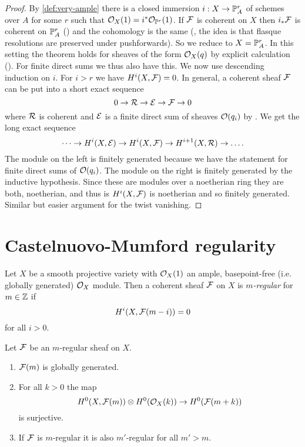 \begin{proof}
	By \cref{def:very-ample} there is a closed immersion $i: X \to \mathbb{P}^r_A$ of schemes over $A$ for some $r$ such that $\mathcal{O}_X(1) = i^*\mathcal{O}_{\mathbb{P}^r}(1)$. If $\mathcal{F}$ is coherent on $X$ then $i_*\mathcal{F}$ is coherent on $\mathbb{P}^r_A$ (\cite[Exercise II.5.5]{hartshorne2013algebraic}) and the cohomology is the same (\cite[Lemma~III.2.10]{hartshorne2013algebraic}, the idea is that flasque resolutions are preserved under pushforwards). So we reduce to $X = \mathbb{P}^r_A$. In this setting the theorem holds for sheaves of the form $\mathcal{O}_X(q)$ by explicit calculation (\cite[Theorem~II.5.1]{hartshorne2013algebraic}). For finite direct sums we thus also have this. We now use descending induction on $i$. For $i > r$ we have $H^i(X ,\mathcal{F}) = 0$. 
	In general, a coherent sheaf $\mathcal{F}$ can be put into a short exact sequence \[
    	0 \to \mathcal{R} \to \mathcal{E} \to \mathcal{F} \to 0
    \] where $\mathcal{R}$ is coherent and $\mathcal{E}$ is a finite direct sum of sheaves $\mathcal{O}(q_i)$ by \cite[Corollary~II.5.18]{hartshorne2013algebraic}. We get the long exact sequence \[
    	\dots \to H^i(X, \mathcal{E}) \to H^i(X, \mathcal{F}) \to H^{i+1}(X, \mathcal{R}) \to \dots .
    \] The module on the left is finitely generated because we have the statement for finite direct sums of $\mathcal{O}(q_i)$. The module on the right is finitely generated by the inductive hypothesis. Since these are modules over a noetherian ring they are both, noetherian, and thus is $H^i(X, \mathcal{F})$ is noetherian and so finitely generated. Similar but easier argument for the twist vanishing.
\end{proof}

\section{Castelnuovo-Mumford regularity}

\begin{definition}
	Let $X$ be a smooth projective variety with $\mathcal{O}_X(1)$ an ample, basepoint-free (i.e. globally generated) $\mathcal{O}_X$ module. Then a coherent sheaf $\mathcal{F}$ on $X$ is \emph{$m$-regular} for $m \in \mathbb{Z}$ if \[
    	H^i(X, \mathcal{F}(m-i)) = 0 
    \] for all $i > 0$. 
\end{definition}

\begin{theorem}
	Let $\mathcal{F}$ be an $m$-regular sheaf on $X$.
	\begin{enumerate}
    	\item $\mathcal{F}(m)$ is globally generated.
		\item For all $k > 0$ the map \[
        	H^0(X, \mathcal{F}(m)) \otimes H^0(\mathcal{O}_X(k)) \to H^0(\mathcal{F}(m+k))
        \] is surjective.
		\item If $\mathcal{F}$ is $m$-regular it is also $m'$-regular for all $m' > m$.
    \end{enumerate}
\end{theorem}

